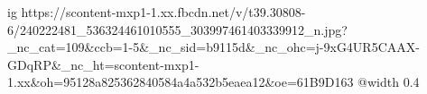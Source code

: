  
 
 
 
 

\ifcmt
  ig https://scontent-mxp1-1.xx.fbcdn.net/v/t39.30808-6/240222481_536324461010555_303997461403339912_n.jpg?_nc_cat=109&ccb=1-5&_nc_sid=b9115d&_nc_ohc=j-9xG4UR5CAAX-GDqRP&_nc_ht=scontent-mxp1-1.xx&oh=95128a825362840584a4a532b5eaea12&oe=61B9D163
  @width 0.4
\fi
